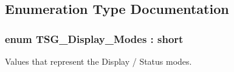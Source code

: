 \subsection{Enumeration Type Documentation}
\subsubsection[{\texorpdfstring{T\+S\+G\+\_\+\+Display\+\_\+\+Modes}{TSG_Display_Modes}}]{\setlength{\rightskip}{0pt plus 5cm}enum {\bf T\+S\+G\+\_\+\+Display\+\_\+\+Modes} \+: short}\hypertarget{group___t_cube_strain_gauge_ga73258438eff8b547e6f73771e6c9687f}{}\label{group___t_cube_strain_gauge_ga73258438eff8b547e6f73771e6c9687f}


Values that represent the Display / Status modes. 

